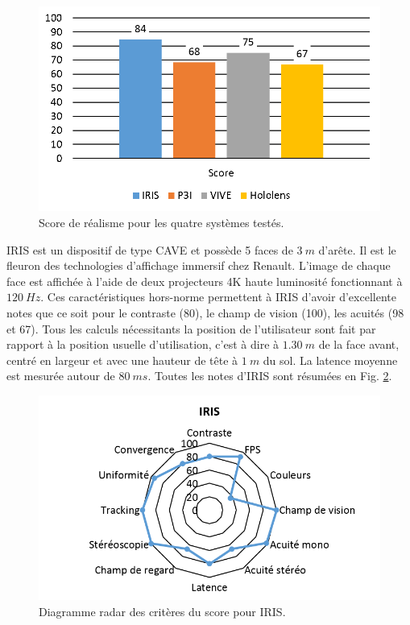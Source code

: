 \begin{figure}
	\centering
	\includegraphics[scale=1]{Figures/ResultatsScoreApplication}
	\caption{Score de réalisme pour les quatre systèmes testés.}
	\label{fig:resultats_score_application}
\end{figure}

\par IRIS est un dispositif de type CAVE et possède 5 faces de $3~m$ d'arête. Il est le fleuron des technologies d'affichage immersif chez Renault. L'image de chaque face est affichée à l'aide de deux projecteurs 4K haute luminosité fonctionnant à $120~Hz$. Ces caractéristiques hors-norme permettent à IRIS d'avoir d'excellente notes que ce soit pour le contraste (80), le champ de vision (100), les acuités (98 et 67). Tous les calculs nécessitants la position de l'utilisateur sont fait par rapport à la position usuelle d'utilisation, c'est à dire à $1.30~m$ de la face avant, centré en largeur et avec une hauteur de tête à $1~m$ du sol. La latence moyenne est mesurée autour de $80~ms$. Toutes les notes d'IRIS sont résumées en Fig. \ref{fig:radar_score_iris}.

\begin{figure}
	\centering
	\includegraphics[scale=1]{Figures/RadarScoreIRIS}
	\caption{Diagramme radar des critères du score pour IRIS.}
	\label{fig:radar_score_iris}
\end{figure}


